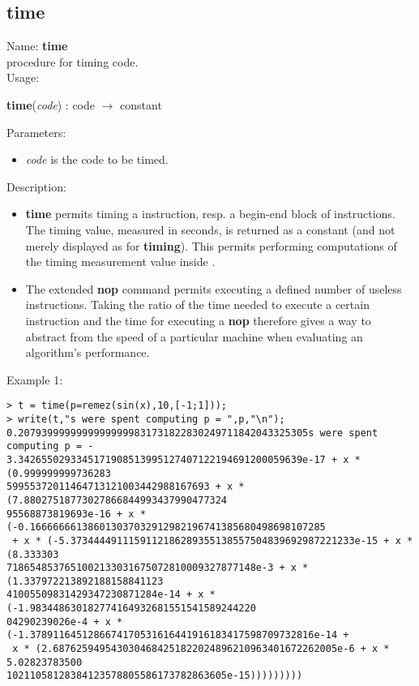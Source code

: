 \subsection{time}
\label{labtime}
\noindent Name: \textbf{time}\\
procedure for timing \sollya code.\\
\noindent Usage: 
\begin{center}
\textbf{time}(\emph{code}) : \textsf{code} $\rightarrow$ \textsf{constant}\\
\end{center}
Parameters: 
\begin{itemize}
\item \emph{code} is the code to be timed.
\end{itemize}
\noindent Description: \begin{itemize}

\item \textbf{time} permits timing a \sollya instruction, resp. a begin-end block
   of \sollya instructions. The timing value, measured in seconds, is returned
   as a \sollya constant (and not merely displayed as for \textbf{timing}). This 
   permits performing computations of the timing measurement value inside \sollya.

\item The extended \textbf{nop} command permits executing a defined number of
   useless instructions. Taking the ratio of the time needed to execute a
   certain \sollya instruction and the time for executing a \textbf{nop}
   therefore gives a way to abstract from the speed of a particular 
   machine when evaluating an algorithm's performance.
\end{itemize}
\noindent Example 1: 
\begin{center}\begin{minipage}{15cm}\begin{Verbatim}[frame=single]
> t = time(p=remez(sin(x),10,[-1;1]));
> write(t,"s were spent computing p = ",p,"\n");
0.20793999999999999999831731822830249711842043325305s were spent computing p = -
3.3426550293345171908513995127407122194691200059639e-17 + x * (0.999999999736283
59955372011464713121003442988167693 + x * (7.88027518773027866844993437990477324
95568873819693e-16 + x * (-0.166666661386013037032912982196741385680498698107285
 + x * (-5.3734444911159112186289355138557504839692987221233e-15 + x * (8.333303
7186548537651002133031675072810009327877148e-3 + x * (1.337972213892188158841123
41005509831429347230871284e-14 + x * (-1.983448630182774164932681551541589244220
04290239026e-4 + x * (-1.3789116451286674170531616441916183417598709732816e-14 +
 x * (2.6876259495430304684251822024896210963401672262005e-6 + x * 5.02823783500
10211058128384123578805586173782863605e-15)))))))))
\end{Verbatim}
\end{minipage}\end{center}
